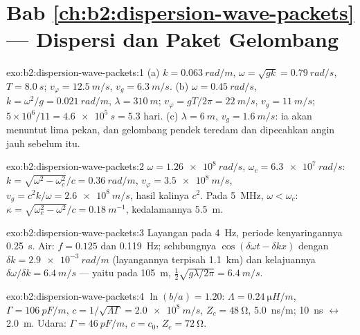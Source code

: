 \section*{Bab \ref{ch:b2:dispersion-wave-packets} --- Dispersi dan Paket Gelombang}

\begin{solution}{exo:b2:dispersion-wave-packets:1}
(a) $k = \qty{0.063}{rad/m}$, $\omega = \sqrt{gk} = \qty{0.79}{rad/s}$, $T = \qty{8.0}{s}$;
$v_\varphi = \qty{12.5}{m/s}$, $v_g = \qty{6.3}{m/s}$. (b) $\omega = \qty{0.45}{rad/s}$, $k = \omega^2
/g = \qty{0.021}{rad/m}$, $\lambda = \qty{310}{m}$; $v_\varphi = gT/2\pi = \qty{22}{m/s}$, $v_g =
\qty{11}{m/s}$; $5 \times 10^6/11 = \qty{4.6e5}{s} = 5.3$ hari. (c) $\lambda = \qty{6}{m}$, $v_g
= \qty{1.6}{m/s}$: ia akan menuntut lima pekan, dan gelombang pendek teredam
 dan dipecahkan angin jauh sebelum itu.
\end{solution}

\begin{solution}{exo:b2:dispersion-wave-packets:2}
$\omega = \qty{1.26e8}{rad/s}$, $\omega_c = \qty{6.3e7}{rad/s}$: $k = \sqrt{\omega^2 - \omega_c^2}/c =
\qty{0.36}{rad/m}$, $v_\varphi = \qty{3.5e8}{m/s}$, $v_g = c^2k/\omega = \qty{2.6e8}{m/s}$,
hasil kalinya $c^2$. Pada \qty{5}{MHz}, $\omega < \omega_c$: $\kappa = \sqrt{\omega_c^2 - \omega^2}/c =
\qty{0.18}{m^{-1}}$, kedalamannya \qty{5.5}{m}.
\end{solution}

\begin{solution}{exo:b2:dispersion-wave-packets:3}
Layangan pada \qty{4}{Hz}, periode kenyaringannya \qty{0.25}{s}. Air: $f = 0.125$ dan
\qty{0.119}{Hz}; selubungnya $\cos(\delta\omega t - \delta kx)$ dengan $\delta k = \qty{2.9e-3}{rad/m}$
(layangannya terpisah \qty{1.1}{km}) dan kelajuannya $\delta\omega/\delta k = \qty{6.4}{m/s}$ ---
yaitu  pada \qty{105}{m}, $\tfrac12\sqrt{g\lambda/2\pi} = \qty{6.4}{m/s}$.
\end{solution}

\begin{solution}{exo:b2:dispersion-wave-packets:4}
$\ln(b/a) = 1.20$: $\Lambda = \qty{0.24}{\micro H/m}$, $\Gamma = \qty{106}{pF/m}$, $c = 1/
\sqrt{\Lambda\Gamma} = \qty{2.0e8}{m/s}$, $Z_c = \qty{48}{\ohm}$, \qty{5.0}{ns/m}; \qty{10}{ns}
$\leftrightarrow$ \qty{2.0}{m}. Udara: $\Gamma = \qty{46}{pF/m}$, $c = c_0$, $Z_c = \qty{72}{\ohm}$.
\end{solution}

